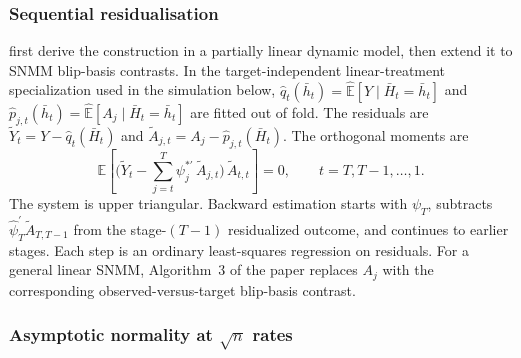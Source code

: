 \subsubsection*{Sequential residualisation}

\citet{lewisSyrgkanis2021dynamicDML} first derive the construction in a partially linear dynamic model, then extend it to SNMM blip-basis contrasts. In the target-independent linear-treatment specialization used in the simulation below, $\hat q_t(\bar h_t)=\widehat{\mathbb E}[Y\mid\bar H_t=\bar h_t]$ and $\hat p_{j,t}(\bar h_t)=\widehat{\mathbb E}[A_j\mid\bar H_t=\bar h_t]$ are fitted out of fold. The residuals are $\tilde Y_t=Y-\hat q_t(\bar H_t)$ and $\tilde A_{j,t}=A_j-\hat p_{j,t}(\bar H_t)$. The orthogonal moments are
\begin{equation}
\mathbb{E}\!\left[\Big(\tilde Y_t - \sum_{j=t}^{T} \psi_j^{*\prime}\,\tilde A_{j,t}\Big)\,\tilde A_{t,t}\right] = 0,
\qquad t=T,T-1,\ldots,1.
\label{eq:dynamic_dml_moment}
\end{equation}
The system is upper triangular. Backward estimation starts with $\psi_T$, subtracts $\hat\psi_T^\prime\tilde A_{T,T-1}$ from the stage-$(T-1)$ residualized outcome, and continues to earlier stages. Each step is an ordinary least-squares regression on residuals. For a general linear SNMM, Algorithm~3 of the paper replaces $A_j$ with the corresponding observed-versus-target blip-basis contrast.

\subsubsection*{Asymptotic normality at $\sqrt n$ rates}

